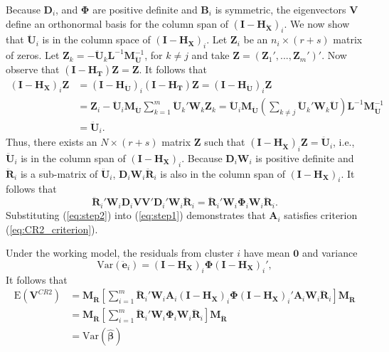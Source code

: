 \documentclass[12pt]{article}\usepackage[]{graphicx}\usepackage[]{color}
\newcommand{\E}{\text{E}}
\newcommand{\Var}{\text{Var}}
\newcommand{\bm}{\mathbf}
\newcommand{\bs}{\boldsymbol}
\begin{document}
Because $\bm{D}_i$, and $\bs\Phi$ are positive definite and $\bm{B}_i$ is symmetric, the eigenvectors $\bm{V}$ define an orthonormal basis for the column span of $\left(\bm{I} - \bm{H_{\ddot{X}}}\right)_i$.
We now show that $\bm{\ddot{U}}_i$ is in the column space of $\left(\bm{I} - \bm{H_X}\right)_i$. 
Let $\bm{Z}_i$ be an $n_i \times (r + s)$ matrix of zeros. 
Let $\bm{Z}_k = - \bm{\ddot{U}}_k \bm{L}^{-1}\bm{M}_{\bm{\ddot{U}}}^{-1}$, for $k \neq j$ and take $\bm{Z} = \left(\bm{Z}_1',...,\bm{Z}_m'\right)'$. 
Now observe that $\left(\bm{I} - \bm{H_T}\right) \bm{Z} = \bm{Z}$. 
It follows that 
\begin{align*}
\left(\bm{I} - \bm{H_X}\right)_i \bm{Z} &= \left(\bm{I} - \bm{H_{\ddot{U}}}\right)_i \left(\bm{I} - \bm{H_T}\right) \bm{Z} = \left(\bm{I} - \bm{H_{\ddot{U}}}\right)_i \bm{Z} \\
&= \bm{Z}_i - \bm{\ddot{U}}_i\bm{M_{\ddot{U}}}\sum_{k=1}^m \bm{\ddot{U}}_k'\bm{W}_k\bm{Z}_k = \bm{\ddot{U}}_i\bm{M_{\ddot{U}}} \left(\sum_{k \neq j} \bm{\ddot{U}}_k' \bm{W}_k \bm{\ddot{U}} \right) \bm{L}^{-1}\bm{M}_{\bm{\ddot{U}}}^{-1} \\
&= \bm{\ddot{U}}_i.
\end{align*}
Thus, there exists an $N \times (r + s)$ matrix $\bm{Z}$ such that $\left(\bm{I} - \bm{H_{\ddot{X}}}\right)_i \bm{Z} = \bm{\ddot{U}}_i$, i.e., $\bm{\ddot{U}}_i$ is in the column span of $\left(\bm{I} - \bm{H_X}\right)_i$. Because $\bm{D}_i \bm{W}_i$ is positive definite and $\bm{\ddot{R}}_i$ is a sub-matrix of $\bm{\ddot{U}}_i$, $\bm{D}_i\bm{W}_i\bm{\ddot{R}}_i$ is also in the column span of $\left(\bm{I} - \bm{H_X}\right)_i$. It follows that 
\begin{equation}
\label{eq:step2}
\bm{\ddot{R}}_i' \bm{W}_i \bm{D}_i \bm{V}\bm{V}' \bm{D}_i' \bm{W}_i \bm{\ddot{R}}_i = \bm{\ddot{R}}_i' \bm{W}_i \bs\Phi_i \bm{W}_i \bm{\ddot{R}}_i.
\end{equation}
Substituting (\ref{eq:step2}) into (\ref{eq:step1}) demonstrates that $\bm{A}_i$ satisfies criterion (\ref{eq:CR2_criterion}).

Under the working model, the residuals from cluster $i$ have mean $\bm{0}$ and variance \[
\Var\left(\bm{\ddot{e}}_i\right) = \left(\bm{I} - \bm{H_X}\right)_i \bs\Phi \left(\bm{I} - \bm{H_X}\right)_i',\] 
It follows that 
\begin{align*}
\E\left(\bm{V}^{CR2}\right) &= \bm{M_{\ddot{R}}}\left[\sum_{i=1}^m \bm{\ddot{R}}_i' \bm{W}_i \bm{A}_i \left(\bm{I} - \bm{H_X}\right)_i \bs\Phi \left(\bm{I} - \bm{H_X}\right)_i' \bm{A}_i \bm{W}_i \bm{\ddot{R}}_i \right] \bm{M_{\ddot{R}}} \\
&= \bm{M_{\ddot{R}}}\left[\sum_{i=1}^m \bm{\ddot{R}}_i' \bm{W}_i \bs\Phi_i \bm{W}_i \bm{\ddot{R}}_i \right] \bm{M_{\ddot{R}}} \\
&= \Var\left(\bs{\hat\beta}\right)
\end{align*}
\end{document}
